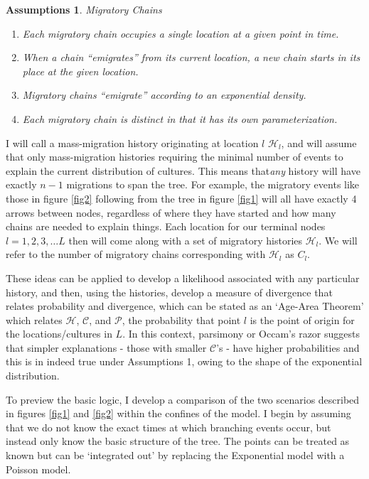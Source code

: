 \documentclass[11pt]{article}
\newtheorem{assumptions}{Assumptions}
\begin{document}
\begin{assumptions}{Migratory Chains}    
\begin{enumerate}
\item Each migratory chain occupies a single location at a given point in time.
\item When a chain ``emigrates'' from its current location, a new chain starts in its place at the given location.
\item Migratory chains ``emigrate'' according to an exponential density.
\item Each migratory chain is distinct in that it has its own parameterization.
\end{enumerate}
\end{assumptions}
I will call a mass-migration history originating at location $l$ $\mathcal{H}_l$, and will assume that only mass-migration histories requiring the minimal number of events to explain the current distribution of cultures. This  means that\textit{any} history will have exactly $n-1$ migrations to span the tree. For example, the migratory events like those in figure \ref{fig2} following from the tree in figure \ref{fig1} will all have exactly 4 arrows between nodes, regardless of where they have started and how many chains are needed to explain things. Each location for our terminal nodes $l=1,2,3,\hdots L$ then will come along with a set of migratory histories $\mathcal{H}_l$. We will refer to the number of migratory chains corresponding with $\mathcal{H}_l$ as $C_l$. 

These ideas can be applied to develop a likelihood associated with any particular history, and then, using the histories, develop a measure of divergence that relates probability and divergence, which can be stated as an `Age-Area Theorem' which relates $\mathcal{H}$, $\mathcal{C}$, and $\mathcal{P}$, the probability that point $l$ is the point of origin for the locations/cultures in $L$. In this context, parsimony or Occam's razor suggests that simpler explanations - those with smaller $\mathcal{C}$'s - have higher probabilities and this is in indeed true under Assumptions 1, owing to the shape of the exponential distribution.

To preview the basic logic, I  develop a comparison of the two scenarios described in figures \ref{fig1} and \ref{fig2} within the confines of the model. I begin by assuming that we do not know the exact times at which branching events occur, but instead only know the basic structure of the tree. The points can be treated as known but can be `integrated out' by replacing the Exponential model with a Poisson model. 
\end{document}

